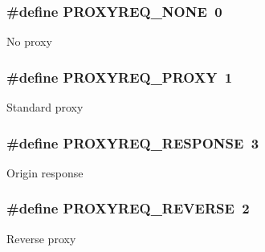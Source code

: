 \subsubsection[{\texorpdfstring{P\+R\+O\+X\+Y\+R\+E\+Q\+\_\+\+N\+O\+NE}{PROXYREQ_NONE}}]{\setlength{\rightskip}{0pt plus 5cm}\#define P\+R\+O\+X\+Y\+R\+E\+Q\+\_\+\+N\+O\+NE~0}\hypertarget{group__ProxyReq_ga7fa0b3313f7e51f2dac785e0b0772c32}{}\label{group__ProxyReq_ga7fa0b3313f7e51f2dac785e0b0772c32}
No proxy 
\subsubsection[{\texorpdfstring{P\+R\+O\+X\+Y\+R\+E\+Q\+\_\+\+P\+R\+O\+XY}{PROXYREQ_PROXY}}]{\setlength{\rightskip}{0pt plus 5cm}\#define P\+R\+O\+X\+Y\+R\+E\+Q\+\_\+\+P\+R\+O\+XY~1}\hypertarget{group__ProxyReq_gaa879e84f9b9d334007ef4c542bf6374e}{}\label{group__ProxyReq_gaa879e84f9b9d334007ef4c542bf6374e}
Standard proxy 
\subsubsection[{\texorpdfstring{P\+R\+O\+X\+Y\+R\+E\+Q\+\_\+\+R\+E\+S\+P\+O\+N\+SE}{PROXYREQ_RESPONSE}}]{\setlength{\rightskip}{0pt plus 5cm}\#define P\+R\+O\+X\+Y\+R\+E\+Q\+\_\+\+R\+E\+S\+P\+O\+N\+SE~3}\hypertarget{group__ProxyReq_gaedfe04be933e20251ce580aa6b15d864}{}\label{group__ProxyReq_gaedfe04be933e20251ce580aa6b15d864}
Origin response 
\subsubsection[{\texorpdfstring{P\+R\+O\+X\+Y\+R\+E\+Q\+\_\+\+R\+E\+V\+E\+R\+SE}{PROXYREQ_REVERSE}}]{\setlength{\rightskip}{0pt plus 5cm}\#define P\+R\+O\+X\+Y\+R\+E\+Q\+\_\+\+R\+E\+V\+E\+R\+SE~2}\hypertarget{group__ProxyReq_gada87167650249c33339a5992ad199219}{}\label{group__ProxyReq_gada87167650249c33339a5992ad199219}
Reverse proxy 